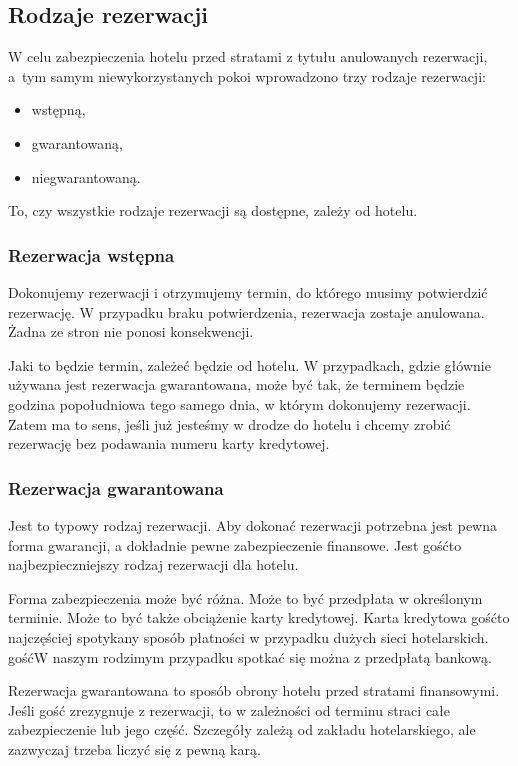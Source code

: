 \documentclass[a4paper,onecolumn,oneside,11pt,wide,floatssmall]{mwrep}
\theoremstyle{definition}
\theoremstyle{plain}%
\theoremstyle{remark}
\begin{document}
\subsection{Rodzaje rezerwacji}
W celu zabezpieczenia hotelu przed stratami z tytułu anulowanych rezerwacji, 
\mbox{a tym} samym niewykorzystanych pokoi wprowadzono trzy rodzaje rezerwacji:

\begin{itemize}
  \item wstępną,
  \item gwarantowaną,
  \item niegwarantowaną.
\end{itemize}

To, czy wszystkie rodzaje rezerwacji są dostępne, zależy od hotelu. 

\subsubsection{Rezerwacja wstępna}
Dokonujemy rezerwacji i otrzymujemy termin, do którego musimy potwierdzić 
rezerwację. W przypadku braku potwierdzenia, rezerwacja zostaje anulowana. 
Żadna ze stron nie ponosi konsekwencji.

Jaki to będzie termin, zależeć będzie od hotelu. W przypadkach, gdzie 
głównie używana jest rezerwacja gwarantowana, może być tak, że terminem 
będzie godzina popołudniowa tego samego dnia, w którym dokonujemy rezerwacji.
 Zatem ma to sens, jeśli już jesteśmy w drodze do hotelu i chcemy zrobić 
 rezerwację bez podawania numeru karty kredytowej.

\subsubsection{Rezerwacja gwarantowana}
Jest to typowy rodzaj rezerwacji. Aby dokonać rezerwacji potrzebna jest 
pewna forma gwarancji, a dokładnie pewne zabezpieczenie finansowe. Jest gość{to 
najbezpieczniejszy} rodzaj rezerwacji dla hotelu.

Forma zabezpieczenia może być różna. Może to być przedpłata w określonym 
terminie. Może to być także obciążenie karty kredytowej. Karta kredytowa gość{to 
najczęściej} spotykany sposób płatności w przypadku dużych sieci hotelarskich. gość{W naszym} 
rodzimym przypadku spotkać się można z przedpłatą bankową.

Rezerwacja gwarantowana to sposób obrony hotelu przed stratami finansowymi. 
Jeśli gość zrezygnuje z rezerwacji, to w zależności od terminu straci 
całe zabezpieczenie lub jego część. Szczegóły zależą od zakładu hotelarskiego, 
ale zazwyczaj trzeba liczyć się z pewną karą.
\end{document}

